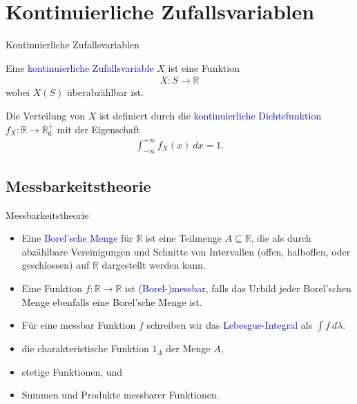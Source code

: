 \documentclass{beamer}
\def\spadding{\vspace{0.25cm}}
\def\b{\textcolor{blue}}
\begin{document}
\section{Kontinuierliche Zufallsvariablen}
\begin{frame}{Kontinuierliche Zufallsvariablen}
    \begin{definition}
        Eine \b{kontinuierliche Zufallsvariable} $X$ ist eine Funktion
        \begin{align*}
            X: S \to \mathbb{R}
        \end{align*}
        wobei $X(S)$ überabzählbar ist.\pause\par\spadding
        Die Verteilung von $X$ ist definiert durch die \b{kontinuierliche Dichtefunktion} $f_X: \mathbb{R} \to \mathbb{R}_0^+$ mit der Eigenschaft
        \begin{align*}
            \int_{- \infty}^{+ \infty} f_X(x)\ dx = 1.
        \end{align*}
    \end{definition}
\end{frame}

\subsection{Messbarkeitstheorie}
\begin{frame}{Messbarkeitstheorie}
    \begin{definition}
        \begin{itemize}
            \item Eine \b{Borel'sche Menge} für $\mathbb{R}$ ist eine Teilmenge $A \subseteq \mathbb{R}$, die als durch abzählbare Vereinigungen und Schnitte von Intervallen (offen, halboffen, oder geschlossen) auf $\mathbb{R}$ dargestellt werden kann.\pause
            \item Eine Funktion $f : \mathbb{R} \to \mathbb{R}$ ist \b{(Borel-)messbar}, falls das Urbild jeder Borel'schen Menge ebenfalls eine Borel'sche Menge ist.\pause
            \item Für eine messbar Funktion $f$ schreiben wir das \b{Lebesgue-Integral} als $\int f\ d\lambda$.
        \end{itemize}
    \end{definition}\pause
    \begin{example}
        \begin{itemize}
            \item die charakteristische Funktion $1_A$ der Menge $A$,
            \item stetige Funktionen, und
            \item Summen und Produkte messbarer Funktionen.
        \end{itemize}
    \end{example}
\end{frame}
\end{document}
